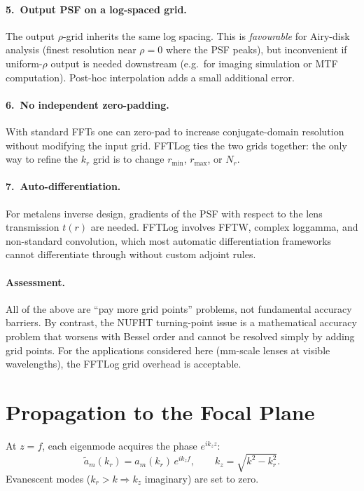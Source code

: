 \documentclass[11pt,a4paper]{article}
\begin{document}
\paragraph{5.\ Output PSF on a log-spaced grid.}
The output $\rho$-grid inherits the same log spacing.  This is \emph{favourable}
for Airy-disk analysis (finest resolution near $\rho = 0$ where the PSF peaks),
but inconvenient if uniform-$\rho$ output is needed downstream (e.g.\ for imaging
simulation or MTF computation).  Post-hoc interpolation adds a small additional
error.

\paragraph{6.\ No independent zero-padding.}
With standard FFTs one can zero-pad to increase conjugate-domain resolution
without modifying the input grid.  FFTLog ties the two grids together: the only
way to refine the $k_r$ grid is to change $r_{\min}$, $r_{\max}$, or $N_r$.

\paragraph{7.\ Auto-differentiation.}
For metalens inverse design, gradients of the PSF with respect to the lens
transmission $t(r)$ are needed.  FFTLog involves FFTW, complex loggamma, and
non-standard convolution, which most automatic differentiation frameworks cannot
differentiate through without custom adjoint rules.

\paragraph{Assessment.}
All of the above are ``pay more grid points'' problems, not fundamental accuracy
barriers.  By contrast, the NUFHT turning-point issue is a mathematical accuracy
problem that worsens with Bessel order and cannot be resolved simply by adding
grid points.  For the applications considered here (mm-scale lenses at visible
wavelengths), the FFTLog grid overhead is acceptable.


\section{Propagation to the Focal Plane}
\label{sec:propagation}

At $z = f$, each eigenmode acquires the phase $e^{ik_z z}$:
\begin{equation}\label{eq:prop}
  \tilde a_m(k_r)
  = a_m(k_r)\,e^{ik_z f},
  \qquad k_z = \sqrt{k^2 - k_r^2}.
\end{equation}
Evanescent modes ($k_r > k \Rightarrow k_z$ imaginary) are set to zero.
\end{document}
